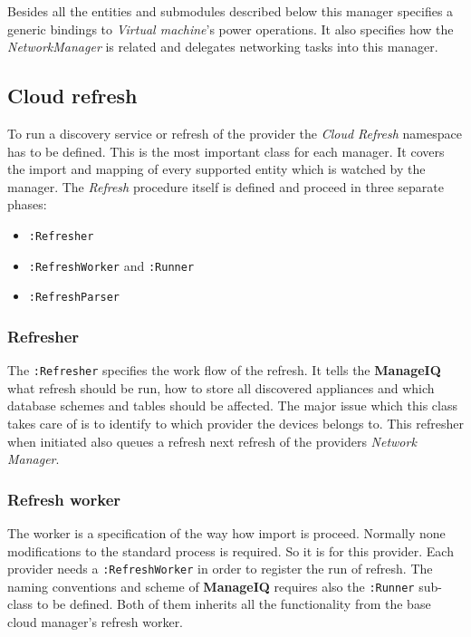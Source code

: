 Besides all the entities and submodules described below this manager specifies a generic bindings to \emph{Virtual machine}'s power operations. It also specifies how the \emph{NetworkManager} is related and delegates networking tasks into this manager.

\subsection{Cloud refresh}
\label{sub:Cloud refresh}

To run a discovery service or refresh of the provider the \emph{Cloud Refresh} namespace has to be defined. This is the most important class for each manager. It covers the import and mapping of every supported entity which is watched by the manager. The \emph{Refresh} procedure itself is defined and proceed in three separate phases:

\begin{itemize}
	\item \texttt{:Refresher}
	\item \texttt{:RefreshWorker} and \texttt{:Runner}
	\item \texttt{:RefreshParser}
\end{itemize}

\subsubsection{Refresher}
\label{subs:Refresher}

The \texttt{:Refresher} specifies the work flow of the refresh. It tells the \textbf{ManageIQ} what refresh should be run, how to store all discovered appliances and which database schemes and tables should be affected. The major issue which this class takes care of is to identify to which provider the devices belongs to. This refresher when initiated also queues a refresh next refresh of the providers \emph{Network Manager}.

\subsubsection{Refresh worker}
\label{subs:Refresh worker}

The worker is a specification of the way how import is proceed. Normally none modifications to the standard process is required. So it is for this provider. Each provider needs a \texttt{:RefreshWorker} in order to register the run of refresh. The naming conventions and scheme of \textbf{ManageIQ} requires also the \texttt{:Runner} sub-class to be defined. Both of them inherits all the functionality from the base cloud manager's refresh worker.

